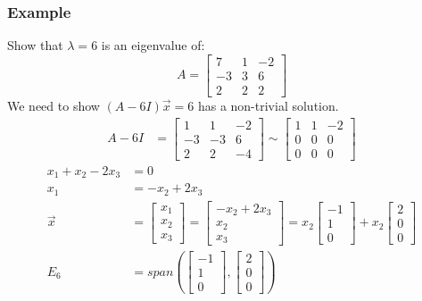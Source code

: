 \documentclass{math}
\begin{document}
\subsubsection*{Example}
Show that \( \lambda = 6 \) is an eigenvalue of:
\[ A = \begin{bmatrix}7 & 1 & -2 \\ -3 & 3 & 6 \\ 2 & 2 & 2\end{bmatrix} \]
We need to show \( (A-6I)\vec{x} = 6 \) has a non-trivial solution.
\begin{align*}
  A-6I &= \begin{bmatrix}
    1 & 1 & -2 \\
    -3 & -3 & 6 \\
    2 & 2 & -4
  \end{bmatrix} \sim \begin{bmatrix}
    1 & 1 & -2 \\
    0 & 0 & 0 \\
    0 & 0 & 0
  \end{bmatrix}
\end{align*}
\begin{align*}
  x_1+x_2-2x_3 &= 0 \\
  x_1 &= -x_2+2x_3 \\
  \vec{x} &= \begin{bmatrix}x_1 \\ x_2 \\ x_3\end{bmatrix}
    = \begin{bmatrix}-x_2+2x_3 \\ x_2 \\ x_3\end{bmatrix}
    = x_2\begin{bmatrix}-1 \\ 1 \\ 0\end{bmatrix}+
    x_2\begin{bmatrix}2 \\ 0 \\ 0\end{bmatrix} \\
  E_6 &= span\left(\begin{bmatrix}-1 \\ 1 \\ 0\end{bmatrix},
    \begin{bmatrix}2 \\ 0 \\ 0\end{bmatrix}\right)
\end{align*}
\end{document}
